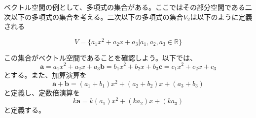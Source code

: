 ベクトル空間の例として、多項式の集合がある。ここではその部分空間である二次以下の多項式の集合を考える。二次以下の多項式の集合\(V_2\)は以下のように定義される

\begin{equation}
	V=\{a_1 x^2+a_2 x+a_3|a_1,a_2,a_3 \in \mathbb{R}\}
\end{equation}

この集合がベクトル空間であることを確認しよう。以下では、
\begin{subequations}
	\begin{equation}
		\boldsymbol{a}=a_1 x^2+a_2 x+a_3
	\end{equation}
	\begin{equation}
		\boldsymbol{b}=b_1 x^2+b_2 x+b_3
	\end{equation}
	\begin{equation}
		\boldsymbol{c}=c_1 x^2+c_2 x+c_3
	\end{equation}
\end{subequations}
とする。また、加算演算を
\begin{equation}
	\boldsymbol{a}+\boldsymbol{b}=
	(a_1+b_1) x^2+(a_2+b_2) x+(a_3+b_3)
\end{equation}
と定義し、定数倍演算を
\begin{equation}
	k\boldsymbol{a}=
	k(a_1) x^2+(ka_2) x+(ka_3)
\end{equation}
と定義する。

